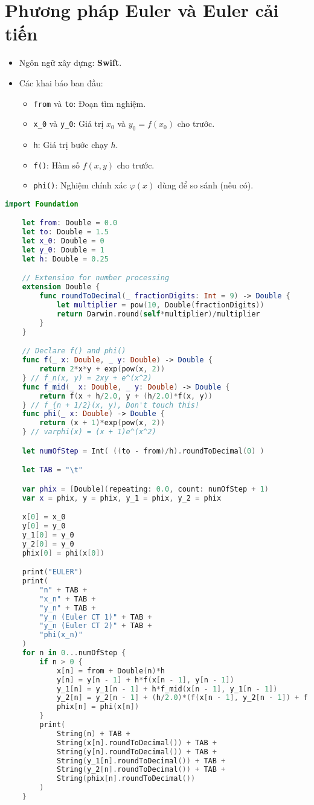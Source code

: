 \section{Phương pháp Euler và Euler cải tiến}
\begin{itemize}
	\item Ngôn ngữ xây dựng: \textbf{Swift}.
	\item Các khai báo ban đầu:
	\begin{itemize}
		\item \texttt{from} và \texttt{to}: Đoạn tìm nghiệm.
		\item \texttt{x\_0} và \texttt{y\_0}: Giá trị $x_0$ và $y_0=f(x_0)$ cho trước.
		\item \texttt{h}: Giá trị bước chạy $h$.
		\item \texttt{f()}: Hàm số $f(x, y)$ cho trước.
		\item \texttt{phi()}: Nghiệm chính xác $\varphi(x)$ dùng để so sánh (nếu có).
	\end{itemize}
\end{itemize}
\begin{lstlisting}[language=Swift]
	import Foundation

	let from: Double = 0.0
	let to: Double = 1.5
	let x_0: Double = 0
	let y_0: Double = 1
	let h: Double = 0.25

	// Extension for number processing
	extension Double {
		func roundToDecimal(_ fractionDigits: Int = 9) -> Double {
			let multiplier = pow(10, Double(fractionDigits))
			return Darwin.round(self*multiplier)/multiplier
		}
	}

	// Declare f() and phi()
	func f(_ x: Double, _ y: Double) -> Double {
		return 2*x*y + exp(pow(x, 2))
	} // f_n(x, y) = 2xy + e^(x^2)
	func f_mid(_ x: Double, _ y: Double) -> Double {
		return f(x + h/2.0, y + (h/2.0)*f(x, y))
	} // f_{n + 1/2}(x, y), Don't touch this!
	func phi(_ x: Double) -> Double {
		return (x + 1)*exp(pow(x, 2))
	} // varphi(x) = (x + 1)e^(x^2)

	let numOfStep = Int( ((to - from)/h).roundToDecimal(0) )

	let TAB = "\t"

	var phix = [Double](repeating: 0.0, count: numOfStep + 1)
	var x = phix, y = phix, y_1 = phix, y_2 = phix

	x[0] = x_0
	y[0] = y_0
	y_1[0] = y_0
	y_2[0] = y_0
	phix[0] = phi(x[0])

	print("EULER")
	print(
		"n" + TAB +
		"x_n" + TAB +
		"y_n" + TAB +
		"y_n (Euler CT 1)" + TAB +
		"y_n (Euler CT 2)" + TAB +
		"phi(x_n)"
	)
	for n in 0...numOfStep {
		if n > 0 {
			x[n] = from + Double(n)*h
			y[n] = y[n - 1] + h*f(x[n - 1], y[n - 1])
			y_1[n] = y_1[n - 1] + h*f_mid(x[n - 1], y_1[n - 1])
			y_2[n] = y_2[n - 1] + (h/2.0)*(f(x[n - 1], y_2[n - 1]) + f(x[n], y[n]))
			phix[n] = phi(x[n])
		}
		print(
			String(n) + TAB +
			String(x[n].roundToDecimal()) + TAB +
			String(y[n].roundToDecimal()) + TAB +
			String(y_1[n].roundToDecimal()) + TAB +
			String(y_2[n].roundToDecimal()) + TAB +
			String(phix[n].roundToDecimal())
		)
	}
\end{lstlisting}
